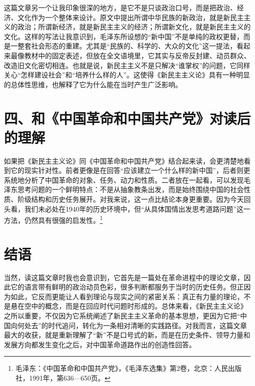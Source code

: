 \documentclass[12pt,a4paper]{article}
\begin{document}
这篇文章另一个让我印象很深的地方，是它不是只谈政治口号，而是把政治、经济、文化作为一个整体来设计。原文中提出所谓中华民族的新政治，就是新民主主义的政治；所谓新经济，就是新民主主义的经济；所谓新文化，就是新民主主义的文化。这样的写法让我意识到，毛泽东所设想的“新中国”不是单纯的政权更替，而是一整套社会形态的重建。尤其是“民族的、科学的、大众的文化”这一提法，看起来最像教材中的固定表述，但放在全文语境里，它其实与反帝反封建、动员群众、改造旧文化密切相连。也就是说，新民主主义不是只解决“谁掌权”的问题，它同样关心“怎样建设社会”和“培养什么样的人”。这使得《新民主主义论》具有一种明显的总体性思维，也解释了它为什么能在当时产生广泛影响。

\section*{四、和《中国革命和中国共产党》对读后的理解}

如果把《新民主主义论》同《中国革命和中国共产党》结合起来读，会更清楚地看到它的现实针对性。前者更像是在回答“应该建立一个什么样的新中国”，后者则更系统地分析了中国革命的对象、任务、动力和性质。二者放在一起看，可以发现毛泽东思考问题的一个鲜明特点：不是从抽象教条出发，而是始终围绕中国的社会性质、阶级结构和历史任务展开。对我来说，这一点比结论本身更重要。因为今天回头看，我们未必处在1940年的历史环境中，但“从具体国情出发思考道路问题”这一方法，仍然具有很强的启发性。\footnote{毛泽东：《中国革命和中国共产党》，《毛泽东选集》第2卷，北京：人民出版社，1991年，第636—650页。}

\section*{结语}

当然，读这篇文章时我也会意识到，它首先是一篇处在革命进程中的理论文章，因此它的语言带有鲜明的政治动员色彩，很多判断都服务于当时的历史任务。但正因为如此，它反而更能让人看到理论与现实之间的紧密关系：真正有力量的理论，不是悬在空中的概念，而是在回应时代问题时形成的。总体来看，《新民主主义论》之所以重要，不仅因为它系统阐述了新民主主义革命的基本思想，更因为它把“中国向何处去”的时代追问，转化为一条相对清晰的实践路径。对我而言，这篇文章最大的收获，就是重新理解了“新”不是口号式的新，而是在历史条件、领导力量和发展方向都发生变化之后，对中国革命道路作出的创造性回答。
\end{document}
